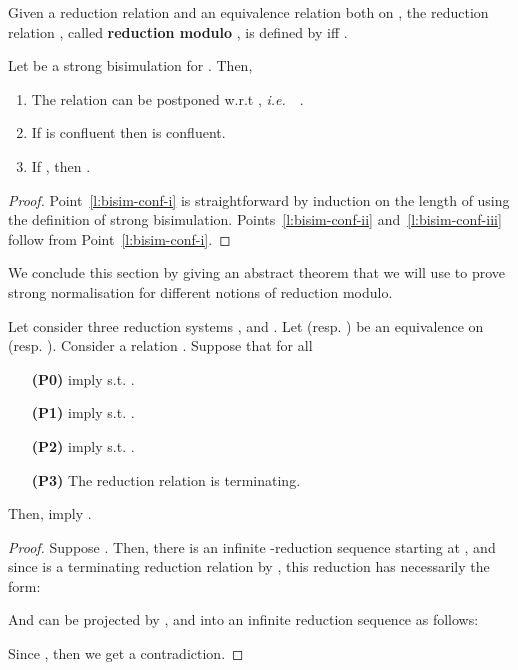 \documentclass{LMCS}
\newcommand{\ie}{{\it  i.e.}~}
\renewcommand{\>}{\rightarrow}
\newcommand{\deft}[1]{{\bf #1}}
\begin{document}
Given a reduction relation   and
an equivalence relation  both on , the reduction relation ,
called \deft{reduction  modulo }, is defined by
 iff .


\begin{lem}
\label{l:bisim-conf}
Let  be a strong bisimulation for 
. Then, 
\begin{enumerate}
  \item \label{l:bisim-conf-i} The relation   can be postponed
w.r.t , \ie\ 
.

  \item \label{l:bisim-conf-ii} If  is confluent then  
   is
    confluent.
\item \label{l:bisim-conf-iii}  If , then .
\end{enumerate}
\end{lem}


\begin{proof}
Point~\ref{l:bisim-conf-i} is straightforward by induction on the
length of  using the definition of strong
bisimulation. Points~\ref{l:bisim-conf-ii} and~\ref{l:bisim-conf-iii}
follow from Point~\ref{l:bisim-conf-i}.
\end{proof}


We conclude this section by giving an abstract theorem that we will
use to prove strong normalisation for different notions of reduction
modulo.

 
\begin{thm}
\label{t:equational-abstract}
 Let consider three reduction systems ,    
and . Let 
 (resp. ) be an equivalence on  (resp. ). 
Consider a relation . Suppose
that for all 


\begin{enumerate}[\bf(P1)]
\item[{\bf (P0)}]  imply  
      s.t. .
\item[{\bf (P1)}]  imply   
      s.t. .
\item[{\bf (P2)}]  imply   
      s.t. .
\item[{\bf (P3)}] The reduction relation  is  
terminating.
\end{enumerate}

Then,  imply  .
\end{thm}

\begin{proof}
Suppose . Then, there is an
infinite -reduction sequence starting at ,
and since  is a terminating reduction  relation by
, this reduction has necessarily the form:

And can be projected by ,  and  into an infinite  reduction sequence as follows:


Since , then we get a contradiction. 
  \end{proof}
\end{document}
